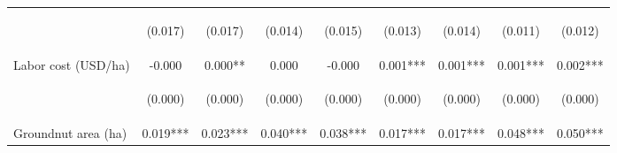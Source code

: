 \begin{center}
\begin{tabular}{lcccccccc}
\vspace{4pt} & \begin{footnotesize}(0.017)\end{footnotesize} & \begin{footnotesize}(0.017)\end{footnotesize} & \begin{footnotesize}(0.014)\end{footnotesize} & \begin{footnotesize}(0.015)\end{footnotesize} & \begin{footnotesize}(0.013)\end{footnotesize} & \begin{footnotesize}(0.014)\end{footnotesize} & \begin{footnotesize}(0.011)\end{footnotesize} & \begin{footnotesize}(0.012)\end{footnotesize} \\
Labor cost (USD/ha) & -0.000 & 0.000** & 0.000 & -0.000 & 0.001*** & 0.001*** & 0.001*** & 0.002*** \\
\vspace{4pt} & \begin{footnotesize}(0.000)\end{footnotesize} & \begin{footnotesize}(0.000)\end{footnotesize} & \begin{footnotesize}(0.000)\end{footnotesize} & \begin{footnotesize}(0.000)\end{footnotesize} & \begin{footnotesize}(0.000)\end{footnotesize} & \begin{footnotesize}(0.000)\end{footnotesize} & \begin{footnotesize}(0.000)\end{footnotesize} & \begin{footnotesize}(0.000)\end{footnotesize} \\
Groundnut area (ha) & 0.019*** & 0.023*** & 0.040*** & 0.038*** & 0.017*** & 0.017*** & 0.048*** & 0.050*** \\

\end{tabular}
\end{center}
